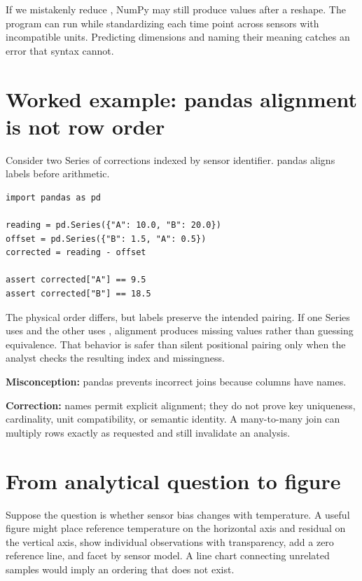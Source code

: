 If we mistakenly reduce , NumPy may still produce values after a
reshape. The program can run while standardizing each time point across sensors
with incompatible units. Predicting dimensions and naming their meaning catches
an error that syntax cannot.

\section{Worked example: pandas alignment is not row order}

Consider two Series of corrections indexed by sensor identifier. pandas aligns
labels before arithmetic.

\begin{lstlisting}
import pandas as pd

reading = pd.Series({"A": 10.0, "B": 20.0})
offset = pd.Series({"B": 1.5, "A": 0.5})
corrected = reading - offset

assert corrected["A"] == 9.5
assert corrected["B"] == 18.5
\end{lstlisting}

The physical order differs, but labels preserve the intended pairing. If one
Series uses  and the other uses , alignment produces
missing values rather than guessing equivalence. That behavior is safer than
silent positional pairing only when the analyst checks the resulting index and
missingness.

\begin{misconceptionbox}
\textbf{Misconception:} pandas prevents incorrect joins because columns have
names.

\textbf{Correction:} names permit explicit alignment; they do not prove key
uniqueness, cardinality, unit compatibility, or semantic identity. A many-to-many
join can multiply rows exactly as requested and still invalidate an analysis.
\end{misconceptionbox}

\section{From analytical question to figure}

Suppose the question is whether sensor bias changes with temperature. A useful
figure might place reference temperature on the horizontal axis and residual
on the vertical axis, show individual observations with transparency, add a
zero reference line, and facet by sensor model. A line chart connecting
unrelated samples would imply an ordering that does not exist.

